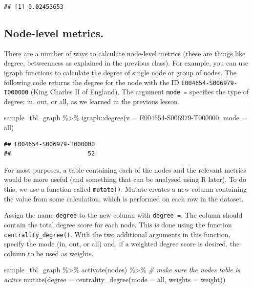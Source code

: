 \documentclass[
]{book}
\newenvironment{Shaded}{\begin{snugshade}}{\end{snugshade}}
\newcommand{\AttributeTok}[1]{\textcolor[rgb]{0.77,0.63,0.00}{#1}}
\newcommand{\CommentTok}[1]{\textcolor[rgb]{0.56,0.35,0.01}{\textit{#1}}}
\newcommand{\FunctionTok}[1]{\textcolor[rgb]{0.00,0.00,0.00}{#1}}
\newcommand{\NormalTok}[1]{#1}
\newcommand{\SpecialCharTok}[1]{\textcolor[rgb]{0.00,0.00,0.00}{#1}}
\newcommand{\StringTok}[1]{\textcolor[rgb]{0.31,0.60,0.02}{#1}}
\begin{document}
\begin{verbatim}
## [1] 0.02453653
\end{verbatim}

\hypertarget{node-level-metrics.}{%
\subsection{Node-level metrics.}\label{node-level-metrics.}}

There are a number of ways to calculate node-level metrics (these are things like degree, betweenness as explained in the previous class). For example, you can use igraph functions to calculate the degree of single node or group of nodes. The following code returns the degree for the node with the ID \texttt{E004654-S006979-T000000} (King Charles II of England). The argument \texttt{mode\ =} specifies the type of degree: in, out, or all, as we learned in the previous lesson.

\begin{Shaded}
\begin{Highlighting}[]
\NormalTok{sample\_tbl\_graph }\SpecialCharTok{\%\textgreater{}\%}\NormalTok{ igraph}\SpecialCharTok{::}\FunctionTok{degree}\NormalTok{(}\AttributeTok{v =} \StringTok{\textquotesingle{}E004654{-}S006979{-}T000000\textquotesingle{}}\NormalTok{, }\AttributeTok{mode =} \StringTok{\textquotesingle{}all\textquotesingle{}}\NormalTok{) }
\end{Highlighting}
\end{Shaded}

\begin{verbatim}
## E004654-S006979-T000000 
##                      52
\end{verbatim}

For most purposes, a table containing each of the nodes and the relevant metrics would be more useful (and something that can be analysed using R later). To do this, we use a function called \texttt{mutate()}. Mutate creates a new column containing the value from some calculation, which is performed on each row in the dataset.

Assign the name \texttt{degree} to the new column with \texttt{degree\ =}. The column should contain the total degree score for each node. This is done using the function \texttt{centrality\_degree()}. With the two additional arguments in this function, specify the mode (in, out, or all) and, if a weighted degree score is desired, the column to be used as weights.

\begin{Shaded}
\begin{Highlighting}[]
\NormalTok{sample\_tbl\_graph }\SpecialCharTok{\%\textgreater{}\%} 
  \FunctionTok{activate}\NormalTok{(nodes) }\SpecialCharTok{\%\textgreater{}\%} \CommentTok{\# make sure the nodes table is active}
  \FunctionTok{mutate}\NormalTok{(}\AttributeTok{degree =} \FunctionTok{centrality\_degree}\NormalTok{(}\AttributeTok{mode =} \StringTok{\textquotesingle{}all\textquotesingle{}}\NormalTok{, }\AttributeTok{weights =}\NormalTok{ weight))}
\end{Highlighting}
\end{Shaded}
\end{document}
